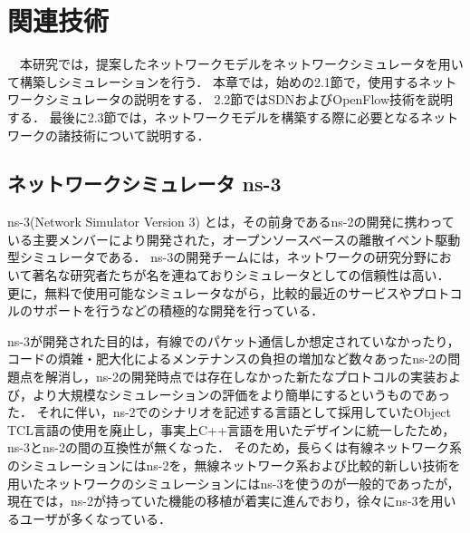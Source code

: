 \chapter{関連技術}

　本研究では，提案したネットワークモデルをネットワークシミュレータを用いて構築しシミュレーションを行う．
本章では，始めの2.1節で，使用するネットワークシミュレータの説明をする．
2.2節ではSDNおよびOpenFlow技術を説明する．
最後に2.3節では，ネットワークモデルを構築する際に必要となるネットワークの諸技術について説明する．

\section{ネットワークシミュレータ ns-3}

ns-3(Network Simulator Version 3)\cite{ns3} \cite{ns3text} とは，その前身であるns-2の開発に携わっている主要メンバーにより開発された，オープンソースベースの離散イベント駆動型シミュレータである．
ns-3の開発チームには，ネットワークの研究分野において著名な研究者たちが名を連ねておりシミュレータとしての信頼性は高い．
更に，無料で使用可能なシミュレータながら，比較的最近のサービスやプロトコルのサポートを行うなどの積極的な開発を行っている．

ns-3が開発された目的は，有線でのパケット通信しか想定されていなかったり，コードの煩雑・肥大化によるメンテナンスの負担の増加など数々あったns-2の問題点を解消し，ns-2の開発時点では存在しなかった新たなプロトコルの実装および，より大規模なシミュレーションの評価をより簡単にするというものであった．
それに伴い，ns-2でのシナリオを記述する言語として採用していたObject TCL言語の使用を廃止し，事実上C++言語を用いたデザインに統一したため，ns-3とns-2の間の互換性が無くなった．
そのため，長らくは有線ネットワーク系のシミュレーションにはns-2を，無線ネットワーク系および比較的新しい技術を用いたネットワークのシミュレーションにはns-3を使うのが一般的であったが，現在では，ns-2が持っていた機能の移植が着実に進んでおり，徐々にns-3を用いるユーザが多くなっている． \\

